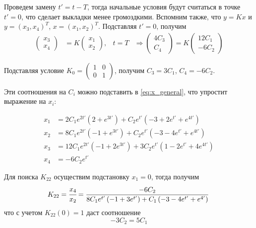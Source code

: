 \documentclass[a4paper,12pt]{article}
\begin{document}
    Проведем замену $t' = t - T$, тогда начальные условия будут считаться в точке $t' = 0$, что сделает выкладки менее громоздкими.
    Вспомним также, что $y = Kx$ и $y = (x_3, x_4)^T$, $x = (x_1, x_2)^T$.
    Подставляя $t' = 0$, получим
    \begin{equation}
        \begin{aligned}
            \begin{pmatrix}
                x_3 \\
                x_4
            \end{pmatrix}
            &= K \begin{pmatrix}
                x_1 \\
                x_2
            \end{pmatrix}
            ,& t = T &\Rightarrow \begin{pmatrix} 4C_3 \\ C_4 \end{pmatrix}
             = K \begin{pmatrix} 12 C_1 \\ -6 C_2 \end{pmatrix}
        \end{aligned}
    \end{equation}

    Подставляя условие $K_0 = \begin{pmatrix}
        1 & 0 \\
        0 & 1
    \end{pmatrix}$, получим $C_3 = 3 C_1$, $C_4 = -6 C_2$.

    Эти соотношения на $C_i$ можно подставить в \eqref{eq:x_general}, что упростит выражение на $x_i$:

    \begin{equation}
        \begin{aligned}
            x_1 &= 2C_1 e^{2t'} \left( 2 + e^{3t'} \right) + C_2 e^{t'} \left( -3 + 2e^{t'} + e^{4t'} \right) \\
            x_2 &= 8C_1 e^{2t'} \left( -1 + e^{3t'} \right) + C_2 e^{t'} \left( -3 - 4e^{t'} + e^{4t'} \right) \\
            x_3 &= 12C_1 e^{2t'} \left( -1 + 2e^{3t'} \right) + 3C_2e^{t'} \left( 1 - 2e^{t'} + 4e^{4t'} \right) \\
            x_4 &= -6C_2 e^{t'}
        \end{aligned}
    \end{equation}

    Для поиска $K_{22}$ осуществим подстановку $x_1 = 0$, тогда получим
    \begin{equation}
        \label{eq:K_22_C}
        K_{22} = \cfrac{x_4}{x_2} = \frac{-6 C_2}{8C_1 e^{t'}\left( -1 + 3e^{t'} \right) + C_1 \left( -3 - 4e^{t'} + e^{4'} \right)}\,
    \end{equation}
    что с учетом $K_{22} (0) = 1$ даст соотношение
    \begin{equation}
        \label{eq:C_1_2}
        -3C_2 = 5C_1
    \end{equation}
\end{document}
